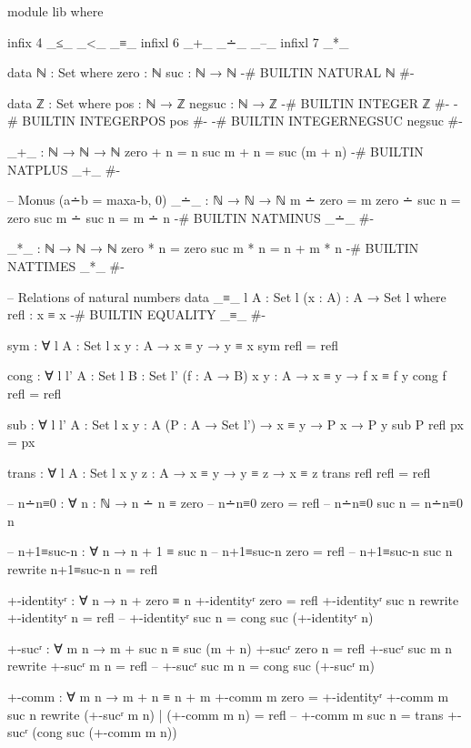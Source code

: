 \documentclass{article}
\begin{document}
\begin{prev}
\begin{code}
module lib where

infix 4 _≤_ _<_ _≡_
infixl 6 _+_ _∸_ _–_
infixl 7 _*_

data ℕ : Set where
    zero : ℕ
    suc : ℕ → ℕ
{-# BUILTIN NATURAL ℕ #-}

data ℤ : Set where
    pos : ℕ → ℤ
    negsuc : ℕ → ℤ
{-# BUILTIN INTEGER       ℤ    #-}
{-# BUILTIN INTEGERPOS    pos    #-}
{-# BUILTIN INTEGERNEGSUC negsuc #-}

_+_ : ℕ → ℕ → ℕ
zero + n = n
suc m + n = suc (m + n)
{-# BUILTIN NATPLUS _+_ #-}

-- Monus (a∸b = max{a-b, 0})
_∸_ : ℕ → ℕ → ℕ
m ∸ zero = m
zero ∸ suc n = zero
suc m ∸ suc n = m ∸ n
{-# BUILTIN NATMINUS _∸_ #-}

_*_ : ℕ → ℕ → ℕ
zero * n = zero
suc m * n = n + m * n
{-# BUILTIN NATTIMES _*_ #-}

-- Relations of natural numbers
data _≡_ {l} {A : Set l} (x : A) : A → Set l where
  refl : x ≡ x
{-# BUILTIN EQUALITY _≡_  #-}

sym : ∀ {l} {A : Set l} {x y : A} → x ≡ y → y ≡ x
sym refl = refl

cong : ∀ {l l'} {A : Set l} {B : Set l'} (f : A → B) {x y : A} → x ≡ y → f x ≡ f y
cong f refl = refl

sub : ∀ {l l'} {A : Set l} {x y : A} (P : A → Set l') → x ≡ y → P x → P y
sub P refl px = px

trans : ∀ {l} {A : Set l} {x y z : A} → x ≡ y → y ≡ z → x ≡ z
trans refl refl = refl

-- n∸n≡0 : ∀ {n : ℕ} → n ∸ n ≡ zero
-- n∸n≡0 {zero} = refl
-- n∸n≡0 {suc n} = n∸n≡0 {n}

-- n+1≡suc-n : ∀ {n} → n + 1 ≡ suc n
-- n+1≡suc-n {zero} = refl
-- n+1≡suc-n {suc n} rewrite n+1≡suc-n {n} = refl

+-identityʳ : ∀ {n} → n + zero ≡ n
+-identityʳ {zero} = refl
+-identityʳ {suc n} rewrite +-identityʳ {n} = refl
-- +-identityʳ {suc n} = cong suc (+-identityʳ {n})

+-sucʳ : ∀ {m n} → m + suc n ≡ suc (m + n)
+-sucʳ {zero} {n} = refl
+-sucʳ {suc m} {n} rewrite +-sucʳ {m} {n} = refl
-- +-sucʳ {suc m} {n} = cong suc (+-sucʳ {m})

+-comm : ∀ {m n} → m + n ≡ n + m
+-comm {m} {zero} = +-identityʳ
+-comm {m} {suc n} 
    rewrite (+-sucʳ {m} {n}) | (+-comm {m} {n}) = refl
-- +-comm {m} {suc n} = trans +-sucʳ (cong suc (+-comm {m} {n}))


\end{code}
\end{prev}
\end{document}
